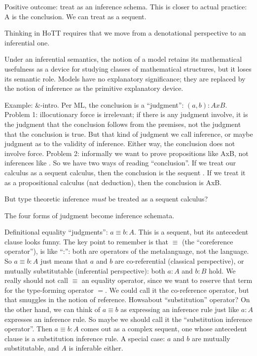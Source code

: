 \documentclass{article}
\begin{document}
Positive outcome: treat \aA as an inference schema.  This is closer to
actual practice: A is the conclusion.  We can treat \aA as a sequent.

Thinking in HoTT requires that we move from a denotational perspective
to an inferential one.

Under an inferential semantics, the notion of a model retains its
mathematical usefulness as a device for studying classes of
mathematical structures, but it loses its semantic role.  Models have
no explanatory significance; they are replaced by the notion of
inference as the primitive explanatory device.

Example: \&-intro.  Per ML, the conclusion is a ``judgment'':
\((a,b){:}AxB\).  Problem 1: illocutionary force is irrelevant; if
there is any judgment involve, it is the judgment that the conclusion
follows from the premises, not the judgment that the conclusion is
true.  But that kind of judgment we call inference, or maybe judgment
as to the validity of inference.  Either way, the conclusion does not
involve force.  Problem 2: informally we want to prove propositions
like AxB, not inferences like \abAB.  So we have two ways of
reading ``conclusion''.  If we treat our calculus as a sequent
calculus, then the conclusion is the sequent \abAB.  If we treat
it as a propositional calculus (nat deduction), then the conclusion is
AxB.

But type theoretic inference \emph{must} be treated as a sequent
calculus?

The four forms of judgment become inference schemata.

Definitional equality ``judgments'': \(a\equiv b{:}A\).  This is a
sequent, but its antecedent clause looks funny.  The key point to
remember is that \(\equiv\) (the ``coreference operator''), is like
``:'': both are operators of the metalanguage, not the language.  So
\(a\equiv b{:}A\) just means that \(a\) and \(b\) are co-referential
(classical perspective), or mutually substitutable (inferential
perspective): both \(a{:}A\) and \(b{:}B\) hold.  We really should not
call \(\equiv\) an equality operator, since we want to reserve that
term for the type-forming operator \(=\).  We could call it the
co-reference operator, but that smuggles in the notion of reference.
Howsabout ``substitution'' operator?  On the other hand, we can think
of \(a\equiv b\) as expressing an inference rule just like \(a{:}A\)
expresses an inference rule.  So maybe we should call it the
``substitution inference operator''.  Then \(a\equiv b{:}A\) comes out
as a complex sequent, one whose antecedent clause is a substitution
inference rule.  A special case: \(a\) and \(b\) are mutually
substitutable, and \(A\) is inferable either.
\end{document}
